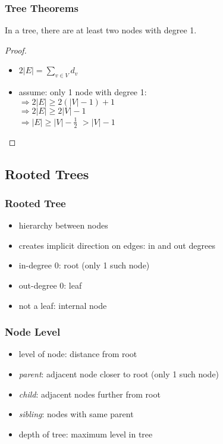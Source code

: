 \documentclass[dvipsnames]{beamer}
\begin{document}
\begin{frame}
  \frametitle{Tree Theorems}

  \begin{theorem}
    In a tree, there are at least two nodes with degree 1.
  \end{theorem}

  \pause
  \begin{proof}
    \begin{itemize}
      \item $2 |E| = \sum_{v \in V} d_v$

      \pause
      \item assume: only 1 node with degree 1:\\
        \pause
        $\Rightarrow 2 |E| \geq 2 (|V| - 1) + 1$\\
        \pause
        $\Rightarrow 2 |E| \geq 2 |V| - 1$\\
        \pause
        $\Rightarrow |E| \geq |V| - \frac{1}{2}$
        \pause
        $> |V| - 1$
    \end{itemize}
  \end{proof}
\end{frame}

\subsection{Rooted Trees}

\begin{frame}
  \frametitle{Rooted Tree}

  \begin{itemize}
    \item hierarchy between nodes
    \item creates implicit direction on edges: in and out degrees

    \pause
    \medskip
    \item in-degree 0: \alert{root} (only 1 such node)
    \item out-degree 0: \alert{leaf}
    \item not a leaf: \alert{internal} node
  \end{itemize}
\end{frame}

\begin{frame}
  \frametitle{Node Level}

  \begin{itemize}
    \item \alert{level} of node: distance from root

    \medskip
    \item \emph{parent}: adjacent node closer to root (only 1 such node)
    \item \emph{child}: adjacent nodes further from root
    \item \emph{sibling}: nodes with same parent

    \medskip
    \item \alert{depth} of tree: maximum level in tree
  \end{itemize}
\end{frame}
\end{document}
